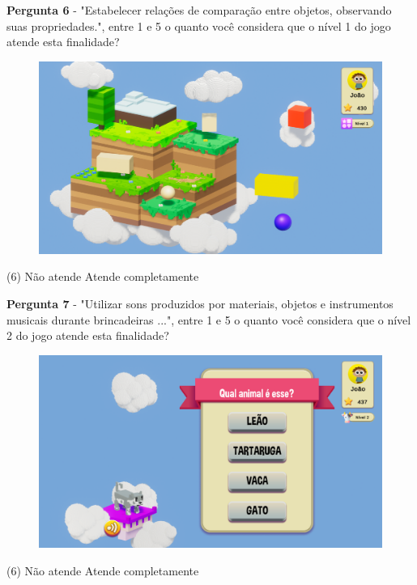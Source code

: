 \documentclass[article,12pt,openany,oneside,a4paper,english,brazil]{abntex2}
\begin{document}
\textbf{Pergunta 6} - "Estabelecer relações de comparação entre objetos, observando suas propriedades.", entre 1 e 5 o quanto você considera que o nível 1 do jogo atende esta finalidade?

\begin{figure}[H]
    \centering
    \label{fig:aluno_pergunta_5}
    \includegraphics[width=0.8\linewidth]{GameScreenshots/Level1.png}
\end{figure}

\normalfont
\begin{tasks}[style=enumerate, item-format={\normalfont\tiny}, after-item-skip=4mm](6)
\task Não atende
\task 
\task 
\task 
\task Atende completamente
\end{tasks}

\textbf{Pergunta 7} - "Utilizar sons produzidos por materiais, objetos e instrumentos musicais durante brincadeiras ...", entre 1 e 5 o quanto você considera que o nível 2 do jogo atende esta finalidade?

\begin{figure}[H]
    \centering
    \label{fig:aluno_pergunta_5}
    \includegraphics[width=0.8\linewidth]{GameScreenshots/Level2.png}
\end{figure}

\normalfont
\begin{tasks}[style=enumerate, item-format={\normalfont\tiny}, after-item-skip=4mm](6)
\task Não atende
\task 
\task 
\task 
\task Atende completamente
\end{tasks}
\end{document}

